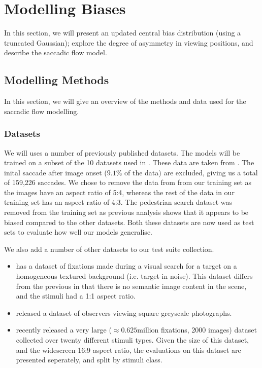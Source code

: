 \section{Modelling Biases}
\label{sec:biases}

In this section, we will present an updated central bias distribution (using a truncated Gaussian); explore the degree of asymmetry in viewing positions, and describe the saccadic flow model. 



\subsection{Modelling Methods}

In this section, we will give an overview of the methods and data used for the saccadic flow modelling.

\subsubsection{Datasets}

We will uses a number of previously published datasets. The models will be trained on a subset of the 10 datasets used in \cite{clarke-tatler2014}. These data are taken from \cite{clarke2013, tatler2005, tatler2007, yun2013, einhauser2008,judd2009}. The inital saccade after image onset ($9.1\%$ of the data) are excluded, giving us a total of 159,226 saccades. We chose to remove the data from \cite{asher2013} from our training set as the images have an aspect ratio of 5:4, whereas the rest of the data in our training set has an aspect ratio of 4:3. The pedestrian search dataset \citep{ehinger2009} was removed from the training set as previous analysis \citep{clarke-tatler2014} shows that it appears to be biased compared to the other datasets. Both these datasets are now used as test sets to evaluate how well our models generalise. 

We also add a number of other datasets to our test suite collection. 
\begin{itemize}
\item \cite{clarke2009} has a dataset of fixations made during a visual search for a target on a homogeneous textured background (i.e. target in noise). This dataset differs from the previous in that there is no semantic image content in the scene, and the stimuli had a 1:1 aspect ratio. \\

\item \cite{greene-wolfe2012} released a dataset of observers viewing square greyscale photographs.

\item \cite{borji2015} recently released a very large ($\approx 0.625$million fixations, 2000 images) dataset collected over twenty different stimuli types. Given the size of this dataset, and the widescreen 16:9 aspect ratio, the evaluations on this dataset are presented seperately, and split by stimuli class.\\

\end{itemize}


